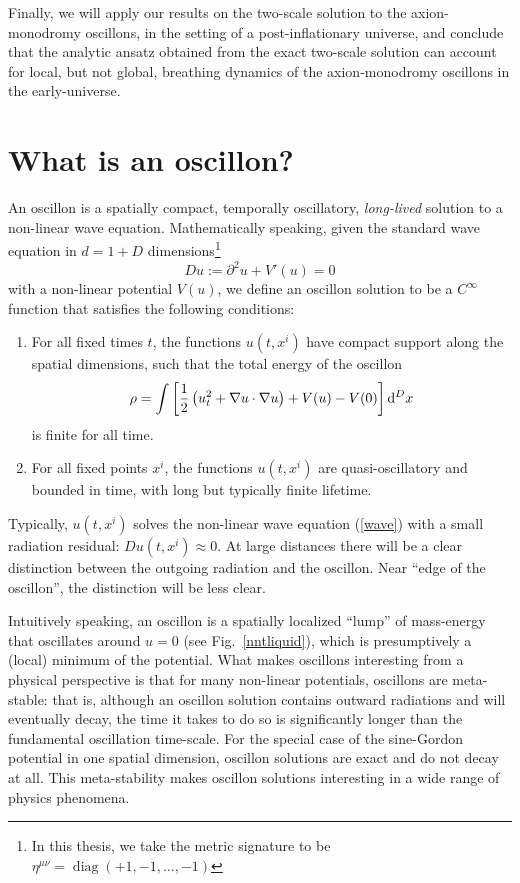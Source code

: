 \documentclass[11pt]{book}
\def\dd{{\rm d}}
\DeclareMathOperator{\diag}{diag}
\begin{document}
Finally, we will apply our results on the two-scale solution to the axion-monodromy oscillons, in the setting of a post-inflationary universe, and conclude that the analytic ansatz obtained from the exact two-scale solution can account for local, but not global, breathing dynamics of the axion-monodromy oscillons in the early-universe.

\section{What is an oscillon?}
An oscillon is a spatially compact, temporally oscillatory, {\em long-lived} solution to a non-linear wave equation. Mathematically speaking, given the standard wave equation in $d=1+D$ dimensions\footnote{In this thesis, we take the metric signature to be $\eta^{\mu\nu} = \diag(+1,-1,\ldots,-1)$}
\begin{equation}\label{wave}
  Du := \partial^2 u + V'(u) = 0
\end{equation}
with a non-linear potential $V(u)$, we define an oscillon solution to be a $C^\infty$ function that satisfies the following conditions:
\begin{enumerate}
\item For all fixed times $t$, the functions $u(t, x^i)$ have compact support along the spatial dimensions, such that the total energy of the oscillon
  \begin{equation}
    \rho = \int \left[\frac{1}{2}\left(u_t^2+ \nabla u\cdot \nabla u \right) + V(u) - V(0)\right] \dd^D x
  \end{equation}
  is finite for all time.
\item For all fixed points $x^i$, the functions $u(t, x^i)$ are quasi-oscillatory and bounded in time, with long but typically finite lifetime.
\end{enumerate}

Typically, $u(t,x^i)$ solves the non-linear wave equation (\ref{wave}) with a small radiation residual: $Du(t,x^i) \approx 0$. At large distances there will be a clear distinction between the outgoing radiation and the oscillon. Near ``edge of the oscillon'', the distinction will be less clear.

Intuitively speaking, an oscillon is a spatially localized ``lump'' of mass-energy that oscillates around $u=0$ (see Fig.~\ref{nntliquid}), which is presumptively a (local) minimum of the potential. What makes oscillons interesting from a physical perspective is that for many non-linear potentials, oscillons are meta-stable: that is, although an oscillon solution contains outward radiations and will eventually decay, the time it takes to do so is significantly longer than the fundamental oscillation time-scale. For the special case of the sine-Gordon potential in one spatial dimension, oscillon solutions are exact and do not decay at all. This meta-stability makes oscillon solutions interesting in a wide range of physics phenomena.
\end{document}
